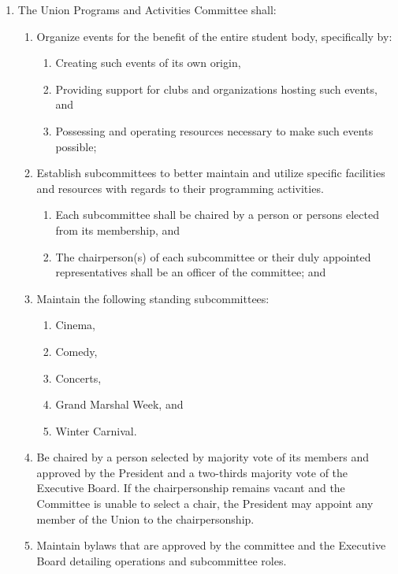 \begin{enumerate}
\begin{enumerate}
\begin{enumerate}
    \item Maintain bylaws detailing operations and the roles of any subcommittees that are subsidiary to these Bylaws and are approved by the Council and the Executive Board.
    \end{enumerate}
  \end{enumerate}
\item The Union Programs and Activities Committee shall:
  \begin{enumerate}
  \item Organize events for the benefit of the entire student body, specifically by:
    \begin{enumerate}
    \item Creating such events of its own origin,
    \item Providing support for clubs and organizations hosting such events, and
    \item Possessing and operating resources necessary to make such events possible;
    \end{enumerate}
  \item Establish subcommittees to better maintain and utilize specific facilities and resources with regards to their programming activities.
    \begin{enumerate}
    \item Each subcommittee shall be chaired by a person or persons elected from its membership, and
    \item The chairperson(s) of each subcommittee or their duly appointed representatives shall be an officer of the committee; and
    \end{enumerate}
  \item Maintain the following standing subcommittees:
    \begin{enumerate}
    \item Cinema,
    \item Comedy,
    \item Concerts,
    \item Grand Marshal Week, and
    \item Winter Carnival.
    \end{enumerate}
  \item Be chaired by a person selected by majority vote of its members and approved by the President and a two-thirds majority vote of the Executive Board. If the chairpersonship remains vacant and the Committee is unable to select a chair, the President may appoint any member of the Union to the chairpersonship.
  \item Maintain bylaws that are approved by the committee and the Executive Board detailing operations and subcommittee roles.

\end{enumerate}
\end{enumerate}
